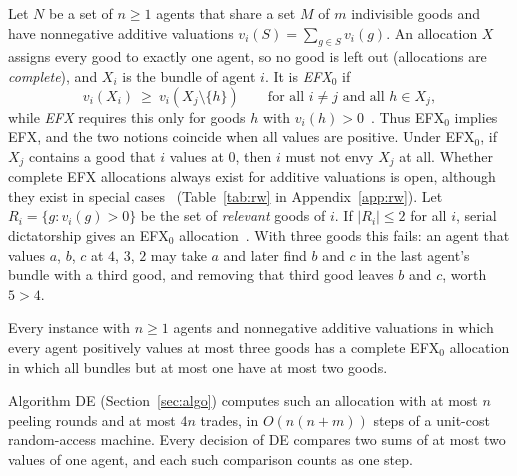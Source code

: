 \documentclass[runningheads,11pt]{llncs}
\newcommand{\efxz}{\texorpdfstring{\mbox{EFX$_0$}}{EFX0}}
\newcommand{\st}{\mathrel{:}}
\newcommand{\DE}{\textup{DE}}
\begin{document}
Let $N$ be a set of $n\ge1$ agents that share a set $M$ of $m$ indivisible goods and have nonnegative additive valuations $v_i(S)=\sum_{g\in S}v_i(g)$. An allocation $X$ assigns every good to exactly one agent, so no good is left out (allocations are \emph{complete}), and $X_i$ is the bundle of agent $i$. It is \emph{\efxz{}} if
\[
  v_i(X_i)\ \ge\ v_i(X_j\setminus\{h\})\qquad\text{for all } i\ne j \text{ and all } h\in X_j,
\]
while \emph{EFX} requires this only for goods $h$ with $v_i(h)>0$~\cite{AmanatidisBFV22}. Thus \efxz{} implies EFX, and the two notions coincide when all values are positive. Under \efxz{}, if $X_j$ contains a good that $i$ values at $0$, then $i$ must not envy $X_j$ at all. Whether complete EFX allocations always exist for additive valuations is open, although they exist in special cases~\cite{ChaudhuryGM20,HVGNV25,Mahara21,AlkassarFM26,Bratby26,AfshinmehrAMMS26,ChristodoulouFKS23,SgouritsaS25,KavianiSS24,LianeasSS26} (Table~\ref{tab:rw} in Appendix~\ref{app:rw}). Let $R_i=\{g\st v_i(g)>0\}$ be the set of \emph{relevant} goods of $i$. If $|R_i|\le2$ for all $i$, serial dictatorship gives an \efxz{} allocation~\cite{MrdEfx}. With three goods this fails: an agent that values $a$, $b$, $c$ at $4$, $3$, $2$ may take $a$ and later find $b$ and $c$ in the last agent's bundle with a third good, and removing that third good leaves $b$ and $c$, worth $5>4$.

\begin{theorem}\label{thm:main}
Every instance with $n\ge1$ agents and nonnegative additive valuations in which every agent positively values at most three goods has a complete \efxz{} allocation in which all bundles but at most one have at most two goods.
\end{theorem}

\begin{theorem}[algorithm]\label{thm:algo}
Algorithm \DE{} (Section~\ref{sec:algo}) computes such an allocation with at most $n$ peeling rounds and at most $4n$ trades, in $O(n(n+m))$ steps of a unit-cost random-access machine. Every decision of \DE{} compares two sums of at most two values of one agent, and each such comparison counts as one step.
\end{theorem}
\end{document}
